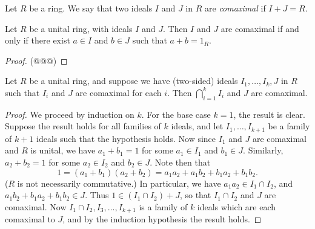\begin{dfn}
Let \(R\) be a ring.
We say that two ideals \(I\) and \(J\) in \(R\) are \emph{comaximal} if \(I+J = R\).
\end{dfn}

\begin{prop}
Let \(R\) be a unital ring, with ideals \(I\) and \(J\).
Then \(I\) and \(J\) are comaximal if and only if there exist \(a \in I\) and \(b \in J\) such that \(a + b = 1_R\).
\end{prop}

\begin{proof}
(@@@)
\end{proof}

\begin{prop}
Let \(R\) be a unital ring, and suppose we have (two-sided) ideals \(I_1, \ldots, I_k, J\) in \(R\) such that \(I_i\) and \(J\) are comaximal for each \(i\).
Then \(\bigcap_{i=1}^k I_i\) and \(J\) are comaximal.
\end{prop}

\begin{proof}
We proceed by induction on \(k\).
For the base case \(k = 1\), the result is clear.
Suppose the result holds for all families of \(k\) ideals, and let \(I_1, \ldots, I_{k+1}\) be a family of \(k+1\) ideals such that the hypothesis holds.
Now since \(I_1\) and \(J\) are comaximal and \(R\) is unital, we have \(a_1 + b_1 = 1\) for some \(a_1 \in I_1\) and \(b_1 \in J\).
Similarly, \(a_2 + b_2 = 1\) for some \(a_2 \in I_2\) and \(b_2 \in J\).
Note then that \[ 1 = (a_1 + b_1)(a_2 + b_2) = a_1a_2 + a_1b_2 + b_1a_2 + b_1b_2. \]
(\(R\) is not necessarily commutative.)
In particular, we have \(a_1a_2 \in I_1 \cap I_2\), and \(a_1b_2 + b_1a_2 + b_1b_2 \in J\).
Thus \(1 \in (I_1 \cap I_2) + J\), so that \(I_1 \cap I_2\) and \(J\) are comaximal.
Now \(I_1 \cap I_2, I_3, \ldots, I_{k+1}\) is a family of \(k\) ideals which are each comaximal to \(J\), and by the induction hypothesis the result holds.
\end{proof}

